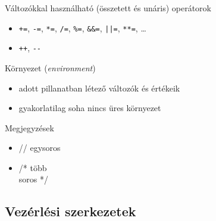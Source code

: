 \begin{frame}
    Változókkal használható (összetett és unáris) operátorok
    \begin{itemize}
        \item \texttt{+=}, \texttt{-=}, \texttt{*=}, \texttt{/=}, \texttt{\%=}, \texttt{\&\&=}, \texttt{||=}, \texttt{**=}, \dots 
        \item \texttt{++}, \texttt{-{-}}
    \end{itemize}
    \vfill
    Környezet (\emph{environment})
    \begin{itemize}
        \item adott pillanatban létező változók és értékeik
        \item gyakorlatilag soha nincs üres környezet
    \end{itemize}
    \vfill
    Megjegyzések
    \begin{itemize}
        \item // egysoros
        \item /* több \\ \quad soros */
    \end{itemize}
\end{frame}

\subsection{Vezérlési szerkezetek}

